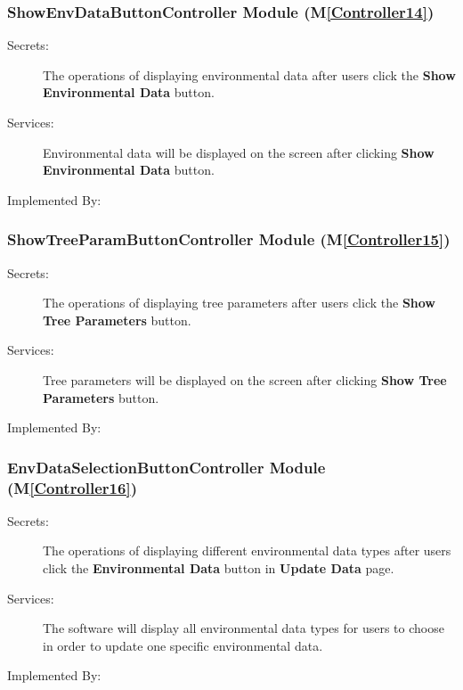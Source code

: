 \documentclass[12pt, titlepage]{article}
\newcommand{\mref}[1]{M\ref{#1}}
\begin{document}
\renewcommand{\bt}{\textbf{Show Environmental Data }}
\subsubsection{ShowEnvDataButtonController Module (\mref{Controller14})}
\begin{description}
\item[Secrets:] The operations of displaying environmental data
 after users click the \bt button.
\item[Services:] Environmental data will be displayed on the screen after clicking \bt button.
\item[Implemented By:] \progname{}
\end{description}

\renewcommand{\bt}{\textbf{Show Tree Parameters }}
\subsubsection{ShowTreeParamButtonController Module (\mref{Controller15})}
\begin{description}
\item[Secrets:] The operations of displaying tree parameters after users click the \bt button.
\item[Services:] Tree parameters will be displayed on the screen after clicking \bt button.
\item[Implemented By:] \progname{}
\end{description}


\renewcommand{\bt}{\textbf{Environmental Data }}
\subsubsection{EnvDataSelectionButtonController Module (\mref{Controller16})}
\begin{description}
\item[Secrets:] The operations of displaying different environmental data types
 after users click the \bt button in \textbf{Update Data} page.
\item[Services:] The software will display all environmental data types for users to choose
in order to update one specific environmental data.
\item[Implemented By:] \progname{}
\end{description}
\end{document}
